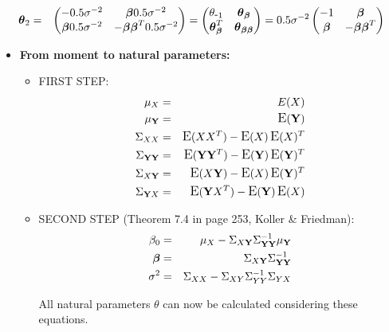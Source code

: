 \documentclass[11pt, oneside]{article}   	%
\DeclareMathOperator*{\E}{\mbox{\large E}}
\numberwithin{figure}{section}
\numberwithin{equation}{section}
\numberwithin{table}{section}
\theoremstyle{definition}
\begin{document}
\begin{appendices}
\begin{itemize}
\begin{eqnarray*}
\boldsymbol \theta_2 &=& 
\begin{pmatrix}
-0.5\sigma^{-2}   &  \boldsymbol \beta 0.5\sigma^{-2}\\
\boldsymbol \beta 0.5\sigma^{-2}   & -\boldsymbol \beta \boldsymbol \beta^T 0.5\sigma^{-2}
\end{pmatrix}
= 
\begin{pmatrix}
\theta_{\mbox{-}1}   &  \boldsymbol \theta_{\boldsymbol \beta} \\
\boldsymbol \theta_{\boldsymbol \beta}^T   &  \boldsymbol \theta_{\boldsymbol \beta\boldsymbol \beta}
\end{pmatrix}
= 0.5\sigma^{-2}
\begin{pmatrix}
-1   &  \boldsymbol \beta \\
\boldsymbol \beta    & -\boldsymbol \beta \boldsymbol \beta^T 
\end{pmatrix}
\end{eqnarray*}

\begin{itemize}
\item \textbf{From moment to natural parameters: }





\begin{itemize}


\item FIRST STEP: 
\begin{eqnarray*}
\mu_X &=& E(X)\\
\mu_\mathbf{Y} &=& \E(\Y)\\
\Sigma_{XX} &=&  \E(XX^T) - \E(X)\E(X)^T\\
\Sigma_{\mathbf{YY}} &=&  \E(\Y\Y^T) - \E(\Y)\E(\Y)^T \\
\Sigma_{X\mathbf{Y}} &=&  \E(X \Y) - \E(X)\E(\Y)^T\\
\Sigma_{\mathbf{Y}X} &=&  \E(\Y X^T) - \E(\Y)\E(X)
\end{eqnarray*}

\item SECOND STEP (Theorem 7.4 in page 253, Koller \& Friedman):
\begin{eqnarray*}
\beta_0 &=& \mu_X - \Sigma_{X\mathbf{Y}}\Sigma^{-1}_{\mathbf{YY}}\mu_\mathbf{Y}\\
\boldsymbol \beta   &=& \Sigma_{X\mathbf{Y}}\Sigma^{-1}_{\mathbf{YY}} \\
\sigma^2 &=& \Sigma_{XX} - \Sigma_{XY}\Sigma^{-1}_{YY}\Sigma_{YX}
\end{eqnarray*}

All natural parameters $\theta$ can now be calculated considering these equations.
\end{itemize}


\end{itemize}
\end{itemize}
\end{appendices}
\end{document}
